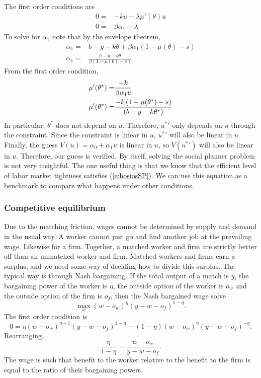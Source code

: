 \documentclass[12pt,reqno]{amsart}
\theoremstyle{definition}
\begin{document}
The first order conditions are
\begin{align*}
  0 = & -ku - \lambda \mu'(\theta) u \\
  0 = & \beta \alpha_1 - \lambda
\end{align*}
To solve for $\alpha_1$ note that by the envelope theorem,
\begin{align*} \alpha_1 = & b - y - k\theta + \beta
  \alpha_1\left(1-\mu(\theta) - s \right) \\ 
  \alpha_1 = & \frac{b - y - k\theta}{\beta\left(1-\mu(\theta) - s
    \right)} 
\end{align*}
From the first order condition,
\begin{align}
  \mu'(\theta^*) = & \frac{-k}{\beta \alpha_1 u} \notag \\
  \mu'(\theta^*) = & \frac{-k\left(1-\mu(\theta^*) - s \right)}{ \left(b-y-k
      \theta^* \right)} \label{e:hosiosSP}
\end{align}
In particular, $\theta^*$ does not depend on $u$. Therefore, ${u^*}'$ only
depends on $u$ through the constraint. Since the constraint is linear
in $u$, ${u^*}'$ will also be linear in $u$. Finally, the guess $V(u) =
\alpha_0 + \alpha_1 u$ is linear in $u$, so $V({u^*}')$ will also be
linear in $u$. Therefore, our guess is verified. By itself, solving
the social planner problem is not very insightful. The one useful
thing is that we know that the efficient level of labor market
tightness satisfies (\ref{e:hosiosSP}). We can use this equation as a
benchmark to compare what happens under other conditions. 

\subsubsection{Competitive equilibrium} 

Due to the matching friction, wages cannot be determined by supply and
demand in the usual way. A worker cannot just go and find another job
at the prevailing wage. Likewise for a firm. Together, a matched
worker and firm are strictly better off than an unmatched worker and
firm. Matched workers and firms earn a surplus, and we need some way
of deciding how to divide this surplus. The typical way is through
Nash bargaining. If the total output of a match is $y$, the bargaining
power of the worker is $\eta$, the outside option of the worker is
$o_w$ and the outside option of the firm is $o_f$, then the Nash
bargained wage solve
\[ \max_w (w - o_w)^\eta (y-w - o_f)^{1-\eta}. \]
The first order condition is
\[ 0 = \eta (w - o_w)^{\eta-1} (y-w - o_f)^{1-\eta} - (1-\eta) (w -
o_w)^\eta (y-w - o_f)^{-\eta}. \]
Rearranging,
\[ \frac{\eta}{1-\eta} = \frac{ w - o_w} {y-w - o_f}. \]
The wage is such that benefit to the worker relative to the benefit to
the firm is equal to the ratio of their bargaining powers. 
\end{document}

